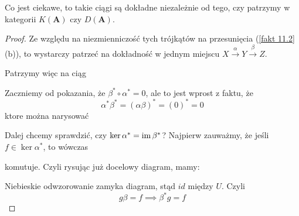 Co jest ciekawe, to takie ciągi są dokładne niezależnie od tego, czy patrzymy w kategorii $K(\mathbf{A})$ czy $D(\mathbf{A})$.

\begin{proof}
  Ze względu na niezmienniczość tych trójkątów na przesunięcia (\ref{fakt 11.2} (b)), to wystarczy patrzeć na dokładność w jednym miejscu $X\xrightarrow{\alpha} Y\xrightarrow{\beta} Z$.

  Patrzymy więc na ciąg
  \begin{center}\end{center}
  Zaczniemy od pokazania, że $\beta^*\circ\alpha^*=0$, ale to jest wprost z faktu, że 
  $$\alpha^*\beta^*=(\alpha\beta)^*=(0)^*=0$$
  ktore można narysować
  \begin{center}\end{center}
  Dalej chcemy sprawdzić, czy $\ker\alpha^*=\operatorname{im}\beta^*$? Najpierw zauważmy, że jeśli $f\in\ker\alpha^*$, to wówczas
  \begin{center}\end{center}
  komutuje. Czyli rysując już docelowy diagram, mamy:
  \begin{center}\end{center}
  Niebieskie odwzorowanie zamyka diagram, stąd $id$ między $U$. Czyli 
  $$g\beta=f\implies \beta^* g=f$$
\end{proof}

